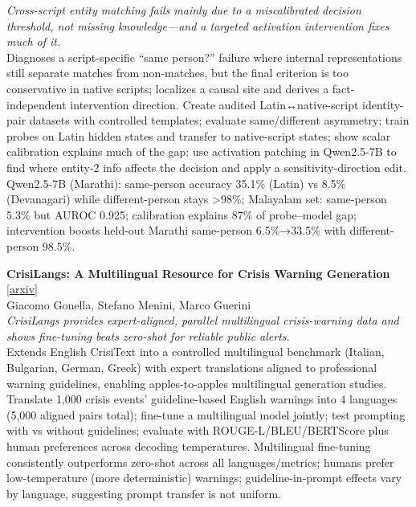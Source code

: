 \documentclass[12pt,letterpaper]{article}
\begin{document}
{\small\textit{Cross-script entity matching fails mainly due to a miscalibrated decision threshold, not missing knowledge---and a targeted activation intervention fixes much of it.}}\\[1pt]
{\footnotesize Diagnoses a script-specific ``same person?'' failure where internal representations still separate matches from non-matches, but the final criterion is too conservative in native scripts; localizes a causal site and derives a fact-independent intervention direction. Create audited Latin↔native-script identity-pair datasets with controlled templates; evaluate same/different asymmetry; train probes on Latin hidden states and transfer to native-script states; show scalar calibration explains much of the gap; use activation patching in Qwen2.5-7B to find where entity-2 info affects the decision and apply a sensitivity-direction edit. Qwen2.5-7B (Marathi): same-person accuracy 35.1\% (Latin) vs 8.5\% (Devanagari) while different-person stays >98\%; Malayalam set: same-person 5.3\% but AUROC 0.925; calibration explains 87\% of probe--model gap; intervention boosts held-out Marathi same-person 6.5\%→33.5\% with different-person 98.5\%.}

\medskip

{\small\textbf{CrisiLangs: A Multilingual Resource for Crisis Warning Generation}} {\scriptsize[\href{https://arxiv.org/abs/2610.31356}{arxiv}]}\\
{\scriptsize Giacomo Gonella, Stefano Menini, Marco Guerini}\\

{\small\textit{CrisiLangs provides expert-aligned, parallel multilingual crisis-warning data and shows fine-tuning beats zero-shot for reliable public alerts.}}\\[1pt]
{\footnotesize Extends English CrisiText into a controlled multilingual benchmark (Italian, Bulgarian, German, Greek) with expert translations aligned to professional warning guidelines, enabling apples-to-apples multilingual generation studies. Translate 1,000 crisis events' guideline-based English warnings into 4 languages (5,000 aligned pairs total); fine-tune a multilingual model jointly; test prompting with vs without guidelines; evaluate with ROUGE-L/BLEU/BERTScore plus human preferences across decoding temperatures. Multilingual fine-tuning consistently outperforms zero-shot across all languages/metrics; humans prefer low-temperature (more deterministic) warnings; guideline-in-prompt effects vary by language, suggesting prompt transfer is not uniform.}
\end{document}
